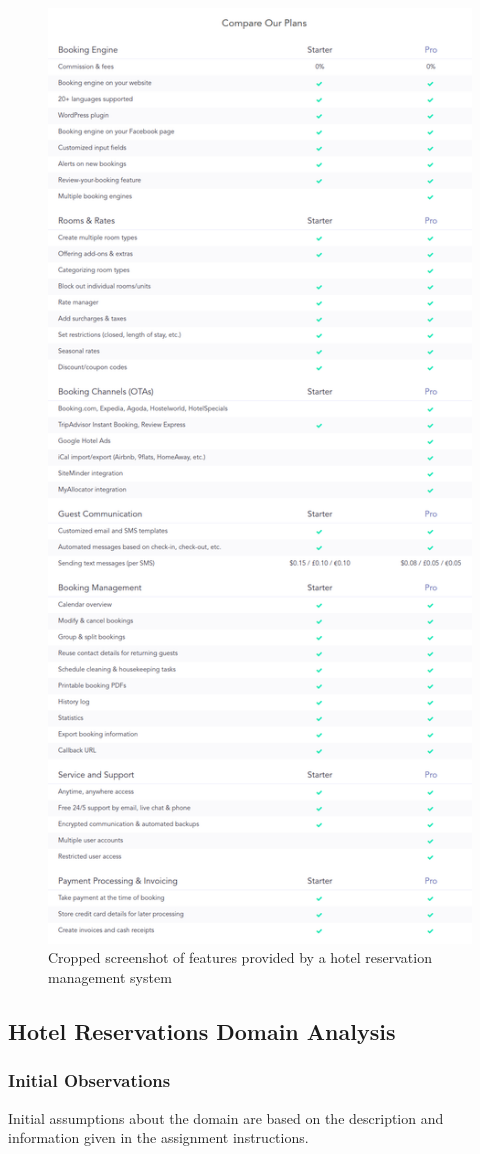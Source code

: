 \begin{figure}[htbp]
  \centering
  \includegraphics[width=0.7\linewidth]{include/sirvoy.png}
  \caption{Cropped screenshot of features provided by a hotel reservation management system\cite{2dv603:assignment1-sirvoy}}
  \label{fig:sirvoy}
\end{figure}



\subsection{Hotel Reservations Domain Analysis}

\subsubsection{Initial Observations}
Initial assumptions about the domain are based on the description and
information given in the assignment instructions.


